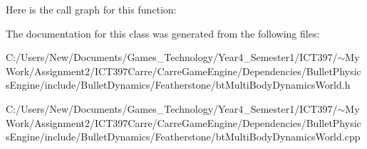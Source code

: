 Here is the call graph for this function:

The documentation for this class was generated from the following files:\begin{CompactItemize}
\item 
C:/Users/New/Documents/Games\_\-Technology/Year4\_\-Semester1/ICT397/$\sim$My Work/Assignment2/ICT397Carre/CarreGameEngine/Dependencies/BulletPhysicsEngine/include/BulletDynamics/Featherstone/btMultiBodyDynamicsWorld.h\item 
C:/Users/New/Documents/Games\_\-Technology/Year4\_\-Semester1/ICT397/$\sim$My Work/Assignment2/ICT397Carre/CarreGameEngine/Dependencies/BulletPhysicsEngine/include/BulletDynamics/Featherstone/btMultiBodyDynamicsWorld.cpp\end{CompactItemize}
